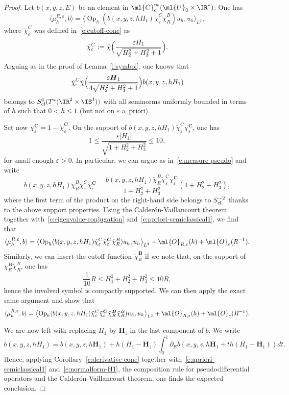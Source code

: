 \documentclass[JEP,XML,SOM,Unicode, NoEqCountersInSection,published]{cedram}
\theoremstyle{plain}
\theoremstyle{definition}
\theoremstyle{remark}
\newcommand{\Op}{\operatorname{Op}}
\begin{document}
\begin{proof} Let $b(x,y,z,E)$ be an element in $\ml{C}^\infty_c(\ml{U}_0\times\IR^*)$. One has
\[
\langle\mu_{h}^{R,\varepsilon},b\rangle=\bigl\langle \Op_h(b(x,y,z,hH_1)\tilde{\chi}_\varepsilon^C\tilde{\chi}_R^B)u_h,u_h\bigr\rangle_{L^2},
\]
where $\tilde{\chi}_\varepsilon^C$ was defined in~\eqref{e:cutoff-cone} as
\[
\tilde{\chi}_\varepsilon^C:=\tilde{\chi}\Bigl(\frac{\varepsilon H_1}{\sqrt{H_2^2+H_3^2+1}}\Bigr).
\]
Arguing as in the proof of Lemma~\ref{l:symbol}, one knows that
\[
\tilde{\chi}_\varepsilon^C\tilde{\chi}\Bigl(\frac{\varepsilon \boldsymbol{H}_1}{4\sqrt{H_2^2+H_3^2+1}}\Bigr)b(x,y,z,hH_1)
\]
belongs to $S^0_{\textup{cl}}(T^*(\IR^2\times\IS^1))$ with all seminorms uniformly bounded in terms of $h$ such that $0<h\leq 1$ (but not on $\varepsilon$ a~priori).

Set now $\chi_\varepsilon^{\boldsymbol{C}}=1-\tilde{\chi}_\varepsilon^{\boldsymbol{C}}$. On the support of $b(x,y,z,hH_1)\tilde{\chi}_\varepsilon^C\chi_\varepsilon^{\boldsymbol{C}}$, one has
\[
1\leq\frac{\varepsilon |H_1|}{\sqrt{1+H_2^2+H_3^2}}\leq 10,
\]
for small enough $\varepsilon>0$. In particular, we can argue as in~\eqref{e:measure-pseudo} and write
\[
b(x,y,z,hH_1)\tilde{\chi}_R^B\tilde{\chi}_\varepsilon^C\chi_\varepsilon^{\boldsymbol{C}}=\frac{b(x,y,z,hH_1)\tilde{\chi}_R^B\tilde{\chi}_\varepsilon^C\chi_\varepsilon^{\boldsymbol{C}}}{1+H_2^2+H_3^2}(1+H_2^2+H_3^2),
\]
where the first term of the product on the right-hand side belongs to $S^{-2}_{\textup{cl}}$ thanks to the above support properties. Using the Calderón-Vaillancourt theorem together with~\eqref{e:eigenvalue-conjugation} and~\eqref{e:apriori-semiclassical1}, we find that
\[
\langle\mu_{h}^{R,\varepsilon},b\rangle=\left\langle \Op_h(b(x,y,z,hH_1)\tilde{\chi}_\varepsilon^C\tilde{\chi}_\varepsilon^{\boldsymbol{C}}\tilde{\chi}_R^B)u_h,u_h\right\rangle_{L^2}+\ml{O}_{R,\varepsilon}(h)+\ml{O}_{\varepsilon}(R^{-1}).
\]
Similarly, we can insert the cutoff function $\tilde{\chi}_R^{\boldsymbol{B}}$ if we note that, on the support of $\chi_R^{\boldsymbol{B}}\tilde{\chi}_R^B$, one has
\[
\frac{1}{10}R\leq H_1^2+H_2^2+H_3^2\leq 10R,
\]
hence the involved symbol is compactly supported. We can then apply the exact same argument and show that
\[
\langle\mu_{h}^{R,\varepsilon},b\rangle=\left\langle \Op_h(b(x,y,z,hH_1)\tilde{\chi}_\varepsilon^C\tilde{\chi}_\varepsilon^{\boldsymbol{C}}\tilde{\chi}_R^{\boldsymbol{B}}\tilde{\chi}_R^B)u_h,u_h\right\rangle_{L^2}+\ml{O}_{R,\varepsilon}(h)+\ml{O}_{\varepsilon}(R^{-1}).
\]

We are now left with replacing $H_1$ by $\boldsymbol{H}_1$ in the last component of $b$. We write
\[
b(x,y,z,hH_1)=b(x,y,z,h\boldsymbol{H}_1)+h(H_1-\boldsymbol{H}_1)\int_0^1\partial_Eb(x,y,z,h\boldsymbol{H}_1+th(H_1-\boldsymbol{H}_1))dt.
\]
Hence, applying Corollary~\ref{c:derivative-cone} together with~\eqref{e:apriori-semiclassical1} and~\eqref{e:normalform-H1}, the composition rule for pseudodifferential operators and the Calderón-Vaillancourt theorem, one finds the expected conclusion.
\end{proof}
\end{document}
